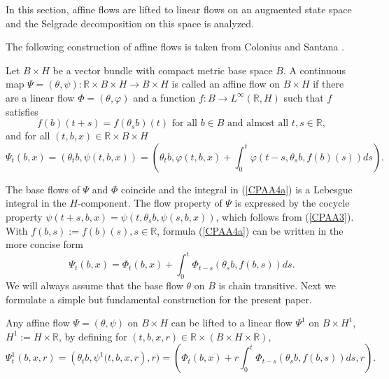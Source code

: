 	In this section, affine flows are lifted to linear flows on an augmented state
	space and the Selgrade decomposition on this space is analyzed.
	
	The following construction of affine flows is taken from Colonius and Santana
	\cite{ColSan11}.
	
	\begin{definition}
		\label{Definition_affine}Let $B\times H$ be a vector bundle with compact
		metric base space $B$. A continuous map $\Psi=(\theta,\psi):\mathbb{R}\times
		B\times H\rightarrow B\times H$ is called an affine flow on $B\times H$ if
		there are a linear flow $\Phi=(\theta,\varphi)$ and a function $f:B\rightarrow
		L^{\infty}(\mathbb{R},H)$ such that $f$ satisfies
		\begin{equation}
			f(b)(t+s)=f(\theta_{s}b)(t)\mbox{ for all }b\in B\mbox{ and almost all }t,s\in
			\mathbb{R}, \label{CPAA3}%
		\end{equation}
		and for all $(t,b,x)\in\mathbb{R}\times B\times H$%
		\begin{equation}
			\Psi_{t}(b,x)=(\theta_{t}b,\psi(t,b,x))=(\theta_{t}b,\varphi(t,b,x)+\int
			_{0}^{t}\varphi(t-s,\theta_{s}b,f(b)(s))ds). \label{CPAA4a}%
		\end{equation}
		
	\end{definition}
	
	The base flows of $\Psi$ and $\Phi$ coincide and the integral in
	(\ref{CPAA4a}) is a Lebesgue integral in the $H$-component. The flow property
	of $\Psi$ is expressed by the cocycle property $\psi(t+s,b,x)=\psi
	(t,\theta_{s}b,\psi(s,b,x))$, which follows from (\ref{CPAA3}). With
	$f(b,s):=f(b)(s),s\in\mathbb{R}$, formula (\ref{CPAA4a}) can be written in the
	more concise form%
	\begin{equation}
		\Psi_{t}(b,x)=\Phi_{t}(b,x)+\int_{0}^{t}\Phi_{t-s}(\theta_{s}b,f(b,s))ds.
		\label{CPAA4}%
	\end{equation}
	We will always assume that the base flow $\theta$ on $B$ is chain transitive.
	Next we formulate a simple but fundamental construction for the present paper.
	
	\begin{proposition}
		\label{Proposition_lift}Any affine flow $\Psi=(\theta,\psi)$ on $B\times H$
		can be lifted to a linear flow $\Psi^{1}$ on $B\times H^{1}$, $H^{1}%
		:=H\times\mathbb{R}$, by defining for $(t,b,x,r)\in\mathbb{R}\times\left(
		B\times H\times\mathbb{R}\right)  $,
		\[
		\Psi_{t}^{1}(b,x,r)=\left(  \theta_{t}b,\psi^{1}(t,b,x,r\right)  ,r)=\left(
		\Phi_{t}(b,x)+r\int_{0}^{t}\Phi_{t-s}(\theta_{s}b,f(b,s))ds,r\right)  .
		\]
		
	\end{proposition}
	
